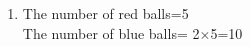 \renewcommand{\theequation}{\theenumi}
\begin{enumerate}[label=\arabic*.,ref=\thesubsubsection.\theenumi]
\item The number of red balls=5
\\
The number of blue balls= 2$\times$5=10
\end{enumerate}